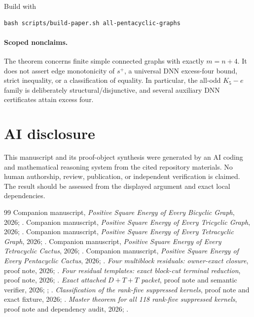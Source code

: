 \documentclass[11pt]{article}
\theoremstyle{remark}
\newcommand{\spn}{s^+}
\begin{document}
Build with
\begin{verbatim}
bash scripts/build-paper.sh all-pentacyclic-graphs
\end{verbatim}

\paragraph{Scoped nonclaims.}
The theorem concerns finite simple connected graphs with exactly $m=n+4$.
It does not assert edge monotonicity of $\spn$, a universal DNN excess-four
bound, strict inequality, or a classification of equality.  In particular,
the all-odd $K_5-e$ family is deliberately structural/disjunctive, and several
auxiliary DNN certificates attain excess four.

\section*{AI disclosure}
This manuscript and its proof-object synthesis were generated by an AI coding
and mathematical reasoning system from the cited repository materials.  No
human authorship, review, publication, or independent verification is claimed.
The result should be assessed from the displayed argument and exact local
dependencies.

\begin{thebibliography}{99}
 Companion manuscript, \emph{Positive Square Energy of Every
Bicyclic Graph}, 2026; .
 Companion manuscript, \emph{Positive Square Energy of Every
Tricyclic Graph}, 2026; .
 Companion manuscript, \emph{Positive Square Energy of
Every Tetracyclic Graph}, 2026; .
 Companion manuscript, \emph{Positive Square Energy
of Every Tetracyclic Cactus}, 2026; .
 Companion manuscript, \emph{Positive Square Energy
of Every Pentacyclic Cactus}, 2026; .
 \emph{Four multiblock residuals: owner-exact closure},
proof note, 2026;
.
 \emph{Four residual templates: exact block-cut
terminal reduction}, proof note, 2026;
.
 \emph{Exact attached $D+T+T$ packet}, proof
note and semantic verifier, 2026;
;
.
 \emph{Classification of the rank-five
suppressed kernels}, proof note and exact fixture, 2026;
.
 \emph{Master theorem for all 118 rank-five suppressed
kernels}, proof note and dependency audit, 2026;
.
\end{thebibliography}
\end{document}
